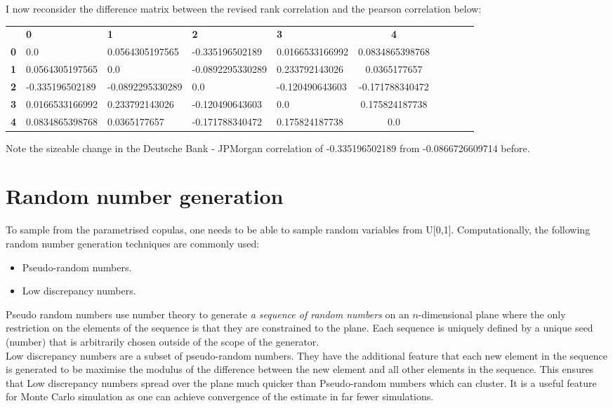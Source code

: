 \documentclass{report}
\theoremstyle{plain}
\theoremstyle{definition}
\begin{document}
I now reconsider the difference matrix between the revised rank correlation and the pearson correlation below:

\begin{center}
	\begin{tabular}{|l|l|l|l|l|c|c|c|c|c|}
		\hline
		& \textbf{0} & \textbf{1} & \textbf{2} & \textbf{3} & \textbf{4}\\\hhline{|=|=|=|=|=|=|}
		\textbf{0} & 0.0 & 0.0564305197565 & -0.335196502189 & 0.0166533166992 & 0.0834865398768\\
		\textbf{1} & 0.0564305197565 & 0.0 & -0.0892295330289 & 0.233792143026 & 0.0365177657\\
		\textbf{2} & -0.335196502189 & -0.0892295330289 & 0.0 & -0.120490643603 & -0.171788340472\\
		\textbf{3} & 0.0166533166992 & 0.233792143026 & -0.120490643603 & 0.0 & 0.175824187738\\
		\textbf{4} & 0.0834865398768 & 0.0365177657 & -0.171788340472 & 0.175824187738 & 0.0\\
		\hline
	\end{tabular}
\end{center}

Note the sizeable change in the Deutsche Bank - JPMorgan correlation of -0.335196502189 from -0.0866726609714 before.

\section{Random number generation}

To sample from the parametrised copulas, one needs to be able to sample random variables from U[0,1]. Computationally, the following random number generation techniques are commonly used:
\begin{itemize}
	\item Pseudo-random numbers.
	\item Low discrepancy numbers.
\end{itemize}

Pseudo random numbers use number theory to generate \emph{a sequence of random numbers} on an $n$-dimensional plane where the only restriction on the elements of the sequence is that they are constrained to the plane. Each sequence is uniquely defined by a unique seed (number) that is arbitrarily chosen outside of the scope of the generator.\\

Low discrepancy numbers are a subset of pseudo-random numbers. They have the additional feature that each new element in the sequence is generated to be maximise the modulus of the difference between the new element and all other elements in the sequence. This ensures that Low discrepancy numbers spread over the plane much quicker than Pseudo-random numbers which can cluster. It is a useful feature for Monte Carlo simulation as one can achieve convergence of the estimate in far fewer simulations.\\
\end{document}
